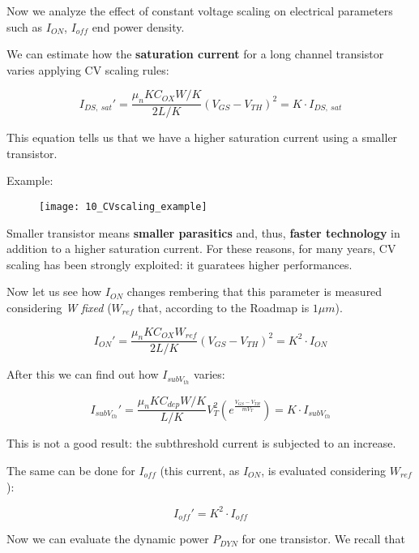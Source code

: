 \documentclass[a4paper, 12pt, twoside, openright]{report}
\begin{document}
{Now we analyze the effect of constant voltage scaling on electrical parameters such as $I_{ON}$, $I_{off}$ end power density.

We can estimate how the \textbf{saturation current} for a long channel transistor varies applying CV scaling rules:

\begin{equation}
I_{DS,\ sat}' = \frac{\mu_n K C_{OX} W/K}{2 L/K}(V_{GS} - V_{TH})^2 = K \cdot I_{DS,\ sat}
\end{equation}

This equation tells us that we have a higher saturation current using a smaller transistor.

Example:

	\begin{figure}[H]
	\centering
	\texttt{[image: 10\_CVscaling\_example]}
	\caption{}
	\label{}
	\end{figure}

Smaller transistor means \textbf{smaller parasitics} and, thus, \textbf{faster technology} in addition to a higher saturation current. For these reasons, for many years, CV scaling has been strongly exploited: it guaratees higher performances.

Now let us see how  $I_{ON}$ changes rembering that this parameter is measured considering \emph{W fixed} ($W_{ref}$ that, according to the Roadmap is $1 \mu m$).

	\begin{equation}
	I_{ON}' = \frac{\mu_n K C_{OX} W_{ref}}{2 L/K}(V_{GS} - V_{TH})^2 = K^2 \cdot I_{ON}
	\end{equation}

After this we can find out how $I_{subV_{th}}$ varies:

	\begin{equation}
	I_{subV_{th}}' = \frac{\mu_n K C_{dep} W/K}{L/K} V_{T}^2 \left( e^{\frac{V_{GS} - V_{TH}}{mV_T}} \right) = K \cdot I_{subV_{th}}
	\end{equation}

This is not a good result: the subthreshold current is subjected to an increase.

The same can be done for $I_{off}$ (this current, as $I_{ON}$, is evaluated considering $W_{ref}$):

	\begin{equation}
	I_{off}' = K^2 \cdot I_{off}
	\end{equation}

Now we can evaluate the dynamic power $P_{DYN}$ for one transistor. We recall that

}
\end{document}
